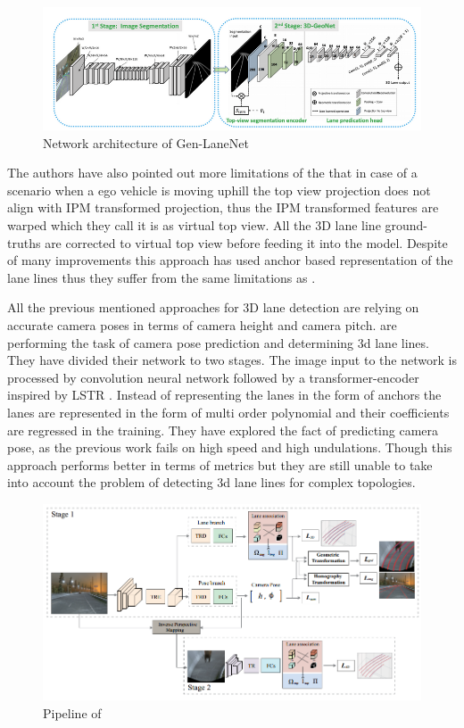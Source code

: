  \begin{figure}[h]
    \centering
    \includegraphics[width=\textwidth]{images/GenLaneNET.png}
    \caption{Network architecture of Gen-LaneNet \cite{guo2020gen}}
    \end{figure}

The authors have also pointed out more limitations of the \cite{DBLP:journals/corr/abs-1811-10203} that in case of a scenario when a ego vehicle is moving uphill the top view projection does not align with IPM transformed projection, thus the IPM transformed features are warped which they call it is as virtual top view. All the 3D lane line ground-truths are corrected to virtual top view before feeding it into the model. Despite of many improvements this approach has used anchor based representation of the lane lines thus they suffer from the same limitations as \cite{DBLP:journals/corr/abs-1811-10203}. 

All the previous mentioned approaches for 3D lane detection are relying on accurate camera poses in terms of camera height and camera pitch. \cite{DBLP:journals/corr/abs-2112-15351} are performing the task of camera pose prediction and determining 3d lane lines. They have divided their network to two stages. The image input to the network is processed by convolution neural network followed by a transformer-encoder inspired by LSTR \cite{LSTR}. Instead of representing the lanes in the form of anchors the lanes are represented in the form of multi order polynomial and their coefficients are regressed in the training. They have explored the fact of predicting camera pose, as the previous work fails on high speed and high undulations. Though this approach performs better in terms of metrics but they are still unable to take into account the problem of detecting 3d lane lines for complex topologies. 

 \begin{figure}[h]
    \centering
    \includegraphics[width=\textwidth]{images/3dLane_camera_pose_pipeline.png}
    \caption{Pipeline of \cite{DBLP:journals/corr/abs-2112-15351}}
    \end{figure}


